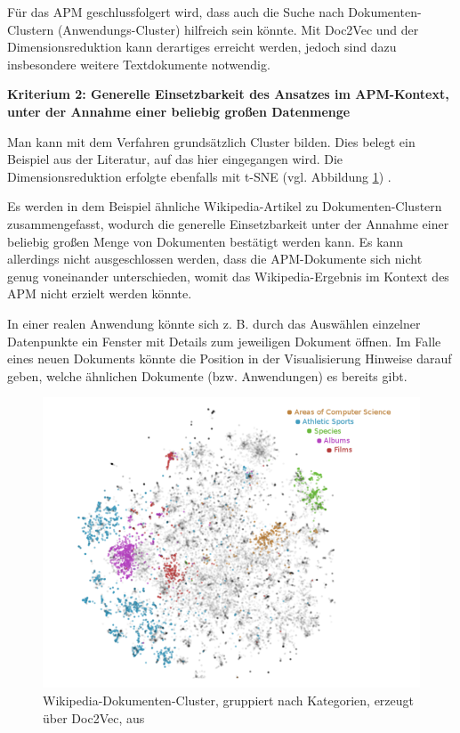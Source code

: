 Für das APM geschlussfolgert wird, dass auch die Suche nach Dokumenten-Clustern (Anwendungs-Cluster) hilfreich sein könnte. Mit Doc2Vec und der Dimensionsreduktion kann derartiges erreicht werden, jedoch sind dazu insbesondere weitere Textdokumente notwendig.

{\bf Kriterium 2: Generelle Einsetzbarkeit des Ansatzes im APM-Kontext, unter der Annahme einer beliebig großen Datenmenge}

Man kann mit dem Verfahren grundsätzlich Cluster bilden. Dies belegt ein Beispiel aus der Literatur, auf das hier eingegangen wird. Die Dimensionsreduktion erfolgte ebenfalls mit t-SNE (vgl. Abbildung \ref{Abbildung:doc2vec2}) \cite{Dai}. 

Es werden in dem Beispiel ähnliche Wikipedia-Artikel zu Dokumenten-Clustern zusammengefasst, wodurch die generelle Einsetzbarkeit unter der Annahme einer beliebig großen Menge von Dokumenten bestätigt werden kann. Es kann allerdings nicht ausgeschlossen werden, dass die APM-Dokumente sich nicht genug voneinander unterschieden, womit das Wikipedia-Ergebnis im Kontext des APM nicht erzielt werden könnte. 

In einer realen Anwendung könnte sich z. B. durch das Auswählen einzelner Datenpunkte ein Fenster mit Details zum jeweiligen Dokument öffnen. Im Falle eines neuen Dokuments könnte die Position in der Visualisierung Hinweise darauf geben, welche ähnlichen Dokumente (bzw. Anwendungen) es bereits gibt. 

\begin{figure}[h]
\centering
\includegraphics[scale=0.95]{content/pics/Picture_15.png}
\caption{Wikipedia-Dokumenten-Cluster, gruppiert nach Kategorien, erzeugt über Doc2Vec, aus \cite{Dai}}
\label{Abbildung:doc2vec2}
\end{figure}

